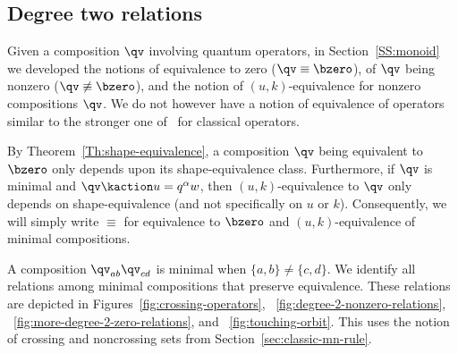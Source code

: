 \subsection{Degree two relations}
\label{S:degreeTwo}

Given a composition $\qv$ involving quantum operators, in
Section~\ref{SS:monoid} we developed the notions of equivalence to zero
($\qv\equiv\bzero$),
of $\qv$ being nonzero ($\qv\not\equiv\bzero$),
and the notion of $(u,k)$-equivalence for nonzero compositions $\qv$.
We do not however have a notion of equivalence of operators similar to the stronger one of~\cite{BS-Monoid} for classical
operators.

By Theorem~\ref{Th:shape-equivalence}, a composition $\qv$ being equivalent to $\bzero$ only depends upon its shape-equivalence class.
Furthermore, if $\qv$ is minimal and $\qv\kaction u=q^\alpha w$, then $(u,k)$-equivalence to $\qv$ only depends on
shape-equivalence (and not specifically on $u$ or $k$).
Consequently, we will simply write $\equiv$ for equivalence to $\bzero$ and $(u,k)$-equivalence of minimal compositions.

A composition $\qv_{ab}\qv_{cd}$ is minimal when $\{a,b\}\neq\{c,d\}$.
We identify all relations among minimal compositions that preserve equivalence.
These relations are  depicted in
Figures~\ref{fig:crossing-operators},
~\ref{fig:degree-2-nonzero-relations},
~\ref{fig:more-degree-2-zero-relations},
and
~\ref{fig:touching-orbit}.
This uses the notion of crossing and noncrossing sets from Section~\ref{sec:classic-mn-rule}.

